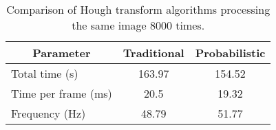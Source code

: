 \begin{table}
\begin{center}
\begin{tabular}{| l | c | c |}
\hline
\multicolumn{1}{|c|}{Parameter}	 & 	\multicolumn{1}{c|}{Traditional}	 & 	\multicolumn{1}{c|}{Probabilistic}\\ \hline
Total time (s)	& 	163.97	 &	154.52\\ \hline
Time per frame (ms)	& 	20.5	 & 	19.32\\ \hline
Frequency (Hz)		& 	48.79	 & 	51.77\\ \hline
\end{tabular}
\caption[Comparison of Hough transform algorithms.]{Comparison of Hough transform algorithms processing the same image 8000 times.}
\label{tab_compeiffel}
\end{center}
\end{table}
